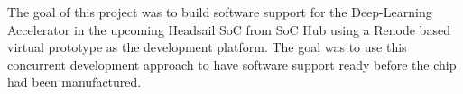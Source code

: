 \documentclass[12pt,a4paper,finnish
]{tunithesis}
\begin{document}
The goal of this project was to build software support for the Deep-Learning Accelerator in the upcoming Headsail SoC from SoC Hub using a Renode based virtual prototype as the development platform. The goal was to use this concurrent development approach to have software support ready before the chip had been manufactured.


%
%
\newpage

\printbibliography[title=References]


%
\end{document}
